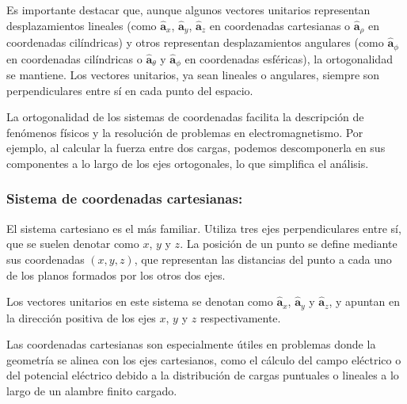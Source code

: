 \documentclass{article}
\begin{document}
Es importante destacar que, aunque algunos vectores unitarios representan desplazamientos lineales (como $\mathbf{\hat{a}}_x$, $\mathbf{\hat{a}}_y$, $\mathbf{\hat{a}}_z$ en coordenadas cartesianas o  $\mathbf{\hat{a}}_\rho$ en coordenadas cilíndricas) y otros representan desplazamientos angulares (como $\mathbf{\hat{a}}_\phi$ en coordenadas cilíndricas o $\mathbf{\hat{a}}_\theta$ y $\mathbf{\hat{a}}_\phi$ en coordenadas esféricas), la ortogonalidad se mantiene. Los vectores unitarios, ya sean lineales o angulares, siempre son perpendiculares entre sí en cada punto del espacio.

La ortogonalidad de los sistemas de coordenadas facilita la descripción de fenómenos físicos y la resolución de problemas en electromagnetismo. Por ejemplo, al calcular la fuerza entre dos cargas, podemos descomponerla en sus componentes a lo largo de los ejes ortogonales, lo que simplifica el análisis.


\subsubsection{Sistema de coordenadas cartesianas:}

El sistema cartesiano es el más familiar. Utiliza tres ejes perpendiculares entre sí, que se suelen denotar como $x$, $y$ y $z$. La posición de un punto se define mediante sus coordenadas $(x, y, z)$, que representan las distancias del punto a cada uno de los planos formados por los otros dos ejes.

Los vectores unitarios en este sistema se denotan como $\mathbf{\hat{a}}_x$, $\mathbf{\hat{a}}_y$ y $\mathbf{\hat{a}}_z$, y apuntan en la dirección positiva de los ejes $x$, $y$ y $z$ respectivamente.

Las coordenadas cartesianas son especialmente útiles en problemas donde la geometría se alinea con los ejes cartesianos, como el cálculo del campo eléctrico o del potencial eléctrico debido a la distribución de cargas puntuales o lineales a lo largo de un alambre finito cargado.
 
 
\end{document}

